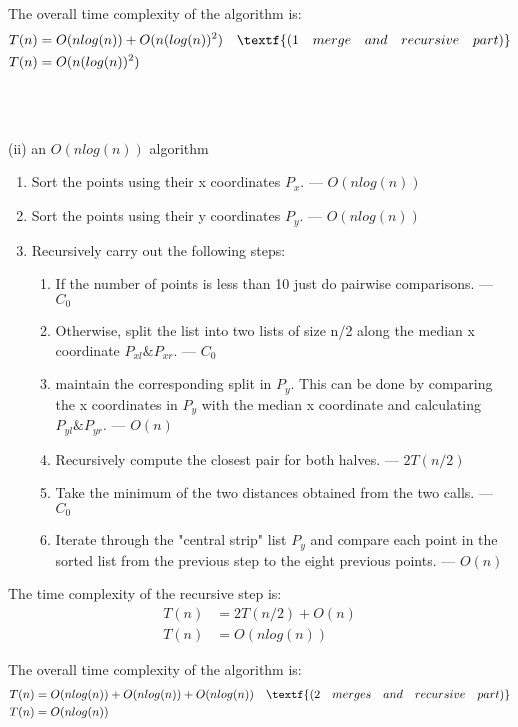 \documentclass[12pt]{article}
\begin{document}
The overall time complexity of the algorithm is: 
\begin{equation}
\begin{aligned}
\nonumber
T(n)&=O(nlog(n)) + O(n(log(n))^2) \quad \textf{(1 \quad merge \quad and \quad recursive \quad part)} \\
T(n)&=O(n(log(n))^2)
\end{aligned}
\end{equation}
\\ \\ \\
(ii) an $O(nlog(n))$ algorithm 
\begin{enumerate}
   \item Sort the points using their x coordinates $P_x$. --- $O(nlog(n))$
    \item Sort the points using their y coordinates $P_y$. --- $O(nlog(n))$
   \item Recursively carry out the following steps:
   \begin{enumerate}
    \item If the number of points is less than 10 just do pairwise comparisons. --- $C_0$
    \item Otherwise, split the list into two lists of size n/2 along the median x coordinate $P_{xl} \& P_{xr}$. --- $C_0$
    \item maintain the corresponding split in $P_y$. This can be done by comparing the x coordinates in $P_y$ with the median x coordinate and calculating $P_{yl} \& P_{yr}$. --- $O(n)$  
    \item Recursively compute the closest pair for both halves. --- $2T(n/2)$
    \item Take the minimum of the two distances obtained from the two calls. --- $C_0$
    \item Iterate through the "central strip" list $P_y$ and compare each point in the sorted list from the previous step to the eight previous points. --- $O(n)$
   \end{enumerate}
\end{enumerate}

The time complexity of the recursive step is: 
\begin{equation}
\begin{aligned}
\nonumber
T(n)&=2T(n/2)+O(n) \\
T(n)&=O(nlog(n))
\end{aligned}
\end{equation}

The overall time complexity of the algorithm is: 
\begin{equation}
\begin{aligned}
\nonumber
T(n)&=O(nlog(n)) + O(nlog(n)) + O(nlog(n)) \quad \textf{(2 \quad merges \quad and \quad recursive \quad part)} \\
T(n)&=O(nlog(n))
\end{aligned}
\end{equation}
\end{document}
